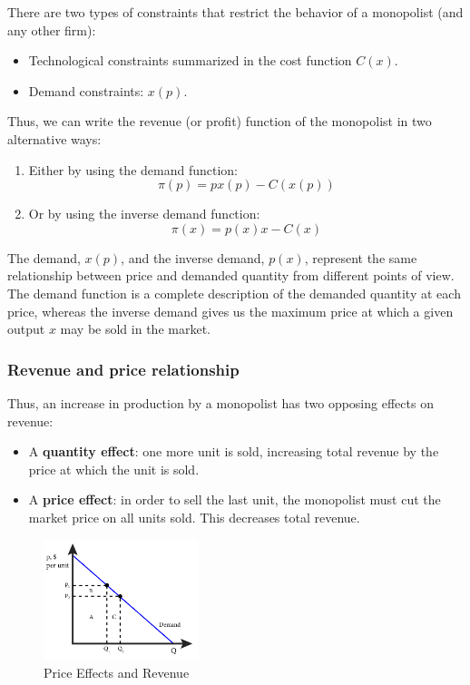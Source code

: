 \documentclass[
  12pt,
  oneside]{book}
\providecommand{\tightlist}{%
  \setlength{\itemsep}{0pt}\setlength{\parskip}{0pt}}
\theoremstyle{definition}
\theoremstyle{definition}
\theoremstyle{definition}
\theoremstyle{definition}
\theoremstyle{remark}
\begin{document}
There are two types of constraints that restrict the behavior of a monopolist (and any other firm):

\begin{itemize}
\tightlist
\item
  Technological constraints summarized in the cost function \(C(x)\).
\item
  Demand constraints: \(x(p)\).
\end{itemize}

Thus, we can write the revenue (or profit) function of the monopolist in two alternative ways:

\begin{enumerate}
\def\labelenumi{\arabic{enumi}.}
\item
  Either by using the demand function:
  \[
  \pi(p) = px(p) - C(x(p))
  \]
\item
  Or by using the inverse demand function:
  \[
  \pi(x) = p(x)x - C(x)
  \]
\end{enumerate}

The demand, \(x(p)\), and the inverse demand, \(p(x)\), represent the same relationship between price and demanded quantity from different points of view. The demand function is a complete description of the demanded quantity at each price, whereas the inverse demand gives us the maximum price at which a given output \(x\) may be sold in the market.

\subsubsection*{Revenue and price relationship}\label{revenue-and-price-relationship}

Thus, an increase in production by a monopolist has two opposing effects on revenue:

\begin{itemize}
\tightlist
\item
  A \textbf{quantity effect}: one more unit is sold, increasing total revenue by the price at which the unit is sold.
\item
  A \textbf{price effect}: in order to sell the last unit, the monopolist must cut the market price on all units sold. This decreases total revenue.
\end{itemize}

\begin{figure}
\centering
\includegraphics[width=0.4\textwidth,height=\textheight]{fig/revenue-mono.png}
\caption[\label{fig:revenue-mono} Price Effects and Revenue]{\label{fig:revenue-mono} Price Effects and Revenue\footnotemark{}}
\end{figure}
\end{document}
